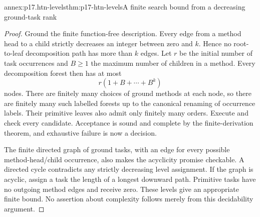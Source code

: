 \begin{annexitem}{annex:p17.htn-levels}{thm:p17-htn-levels}{A finite search bound from a decreasing ground-task rank}
\begin{proof}
Ground the finite function-free description. Every edge from a method head
to a child strictly decreases an integer between zero and \(k\). Hence no
root-to-leaf decomposition path has more than \(k\) edges. Let \(r\) be
the initial number of task occurrences and \(B\geq1\) the maximum number
of children in a method. Every decomposition forest then has at most
\[
 r(1+B+\cdots+B^k)
\]
nodes. There are finitely many choices of ground methods at each node, so
there are finitely many such labelled forests up to the canonical renaming
of occurrence labels. Their primitive leaves also admit only finitely many
orders. Execute and check every candidate. Acceptance is sound and complete
by the finite-derivation theorem, and exhaustive failure is now a decision.

The finite directed graph of ground tasks, with an edge for every possible
method-head/child occurrence, also makes the acyclicity promise checkable.
A directed cycle contradicts any strictly decreasing level assignment.
If the graph is acyclic, assign a task the length of a longest downward path.
Primitive tasks have no outgoing method edges and receive zero. These levels
give an appropriate finite bound. No assertion about complexity follows
merely from this decidability argument.
\end{proof}
\end{annexitem}

